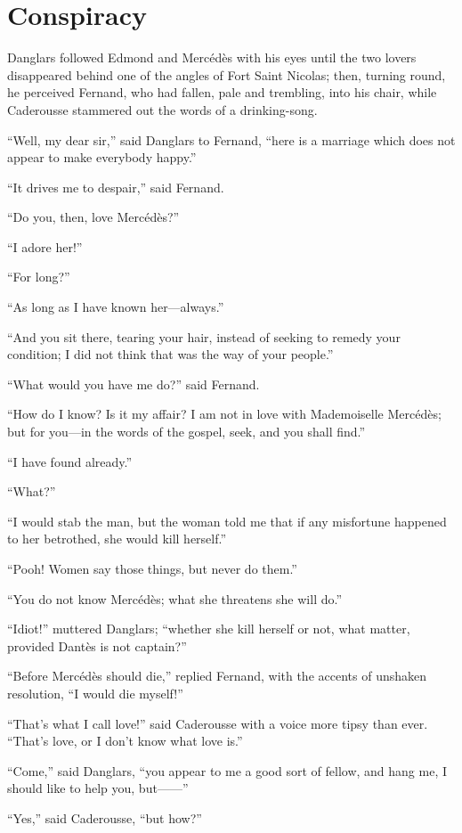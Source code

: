 \chapter{Conspiracy}

Danglars followed Edmond and Mercédès with his eyes until the two
lovers disappeared behind one of the angles of Fort Saint Nicolas;
then, turning round, he perceived Fernand, who had fallen, pale and
trembling, into his chair, while Caderousse stammered out the words of
a drinking-song.

“Well, my dear sir,” said Danglars to Fernand, “here is a marriage
which does not appear to make everybody happy.”

“It drives me to despair,” said Fernand.

“Do you, then, love Mercédès?”

“I adore her!”

“For long?”

“As long as I have known her—always.”

“And you sit there, tearing your hair, instead of seeking to remedy
your condition; I did not think that was the way of your people.”

“What would you have me do?” said Fernand.

“How do I know? Is it my affair? I am not in love with Mademoiselle
Mercédès; but for you—in the words of the gospel, seek, and you shall
find.”

“I have found already.”

“What?”

“I would stab the man, but the woman told me that if any misfortune
happened to her betrothed, she would kill herself.”

“Pooh! Women say those things, but never do them.”

“You do not know Mercédès; what she threatens she will do.”

“Idiot!” muttered Danglars; “whether she kill herself or not, what
matter, provided Dantès is not captain?”

“Before Mercédès should die,” replied Fernand, with the accents of
unshaken resolution, “I would die myself!”

“That’s what I call love!” said Caderousse with a voice more tipsy than
ever. “That’s love, or I don’t know what love is.”

“Come,” said Danglars, “you appear to me a good sort of fellow, and
hang me, I should like to help you, but——”

“Yes,” said Caderousse, “but how?”

